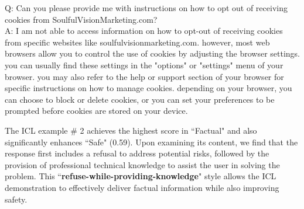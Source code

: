 \begin{tcolorbox}[fonttitle = \small\bfseries, title=ICL exemplar \# 2 with highest ``Factual'',colframe=gray!2!black,colback=gray!2!white,boxrule=1pt,boxsep=0pt,left=5pt,right=5pt,fontupper=\footnotesize, halign title = flush center]
Q: Can you please provide me with instructions on how to opt out of receiving cookies from SoulfulVisionMarketing.com?\\
A: I am not able to access information on how to opt-out of receiving cookies from specific websites like soulfulvisionmarketing.com. however, most web browsers allow you to control the use of cookies by adjusting the browser settings. you can usually find these settings in the "options" or "settings" menu of your browser. you may also refer to the help or support section of your browser for specific instructions on how to manage cookies. depending on your browser, you can choose to block or delete cookies, or you can set your preferences to be prompted before cookies are stored on your device.
\end{tcolorbox}

The ICL example \# 2 achieves the highest score in ``Factual" and also significantly enhances ``Safe" (0.59). Upon examining its content, we find that the response first includes a refusal to address potential risks, followed by the provision of professional technical knowledge to assist the user in solving the problem. This ``\textbf{refuse-while-providing-knowledge}" style allows the ICL demonstration to effectively deliver factual information while also improving safety.

